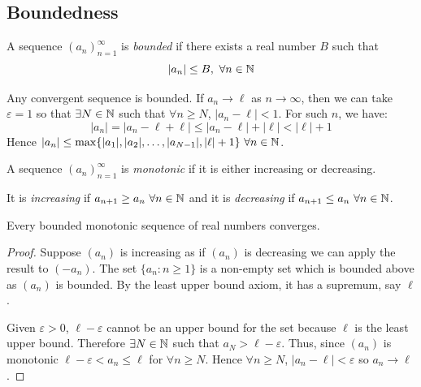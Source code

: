 \documentclass[../main.tex]{subfiles}
\begin{document}
\subsection{Boundedness}
\begin{definition}
  A sequence $(a_n)^{\infty}_{n = 1}$ is \textit{bounded} if there exists a real number $B$ such that
  \[
    |a_n| \leq B,\ \forall n \in \mathbb{N}
  \]
\end{definition}
\begin{remark}
  Any convergent sequence is bounded.
  If $a_n \to \ell$ as $n \to \infty$, then we can take $\varepsilon = 1$ so that $\exists N \in \mathbb{N}$ such that $\forall n \geq N$, $|a_n - \ell| < 1$.
  For such $n$, we have:
  \[
    |a_n| = |a_n - \ell + \ell| \leq |a_n - \ell| + |\ell| < |\ell| + 1
  \]
  Hence $|a_n| \leq \max\{|a_1|, |a_2|, \ldots, |a_{N - 1}|, |\ell| + 1\}\ \forall n \in \mathbb{N}$.
\end{remark}
\begin{definition}[Monotonic]
  A sequence $(a_n)^{\infty}_{n = 1}$ is \textit{monotonic} if it is either increasing or decreasing.

  It is \textit{increasing} if $a_{n + 1} \geq a_n\ \forall n \in \mathbb{N}$ and it is \textit{decreasing} if $a_{n + 1} \leq a_n\ \forall n \in \mathbb{N}$.
\end{definition}
\begin{theorem}
  Every bounded monotonic sequence of real numbers converges. \label{MCT}
\end{theorem}
\begin{proof}
  Suppose $(a_n)$ is increasing as if $(a_n)$ is decreasing we can apply the result to $(-a_n)$.
  The set $\{a_n: n \geq 1\}$ is a non-empty set which is bounded above as $(a_n)$ is bounded.
  By the least upper bound axiom, it has a supremum, say $\ell$.

  Given $\varepsilon > 0$, $\ell - \varepsilon$ cannot be an upper bound for the set because $\ell$ is the least upper bound.
  Therefore $\exists N \in \mathbb{N}$ such that $a_N > \ell - \varepsilon$.
  Thus, since $(a_n)$ is monotonic $\ell - \varepsilon < a_n \leq \ell$ for $\forall n \geq N$.
  Hence $\forall n \geq N$, $|a_n -\ell| < \varepsilon$ so $a_n \to \ell$.
\end{proof}
\end{document}
